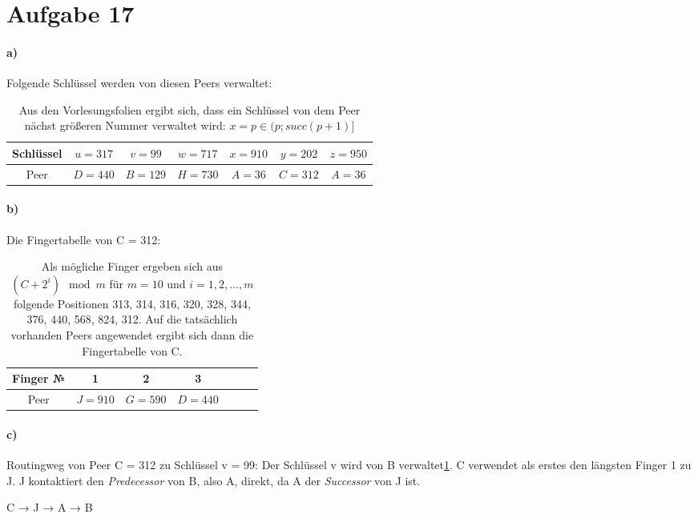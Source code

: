\documentclass[10pt,a4paper]{article}
\begin{document}
\newpage

\section*{Aufgabe 17}
\paragraph*{a)} Folgende Schlüssel werden von diesen Peers verwaltet:

\begin{table}[h]
\centering
\begin{tabular}{c|c|c|c|c|c|c}
Schlüssel & $u=317$ & $v=99$ & $w=717$ & $x=910$ & $y=202$ & $z=950$ \\ 
\hline 
Peer & $D=440$ & $B=129$ & $H=730$ & $A=36$ & $C=312$ & $A=36$ \\ 
\end{tabular} 
\caption{Aus den Vorlesungsfolien ergibt sich, dass ein Schlüssel von dem Peer nächst größeren Nummer verwaltet wird: $x=p \in (p;succ(p+1)]$}
\label{Schlüsseltabelle}
\end{table}

\paragraph*{b)} Die Fingertabelle von C = 312:
\begin{table}[h]
\centering
\begin{tabular}{c|c|c|c|c|c|c}
Finger № & 1 & 2 & 3   \\ 
\hline 
Peer & $J=910$ & $G=590$ & $D=440$   \\ 
\end{tabular} 
\caption{Als mögliche Finger ergeben sich aus $(C+2^{i})\mod m$ für $m=10$ und $i = 1,2,…,m$ folgende Positionen 313, 314, 316, 320, 328, 344, 376, 440, 568, 824, 312. Auf die tatsächlich vorhanden Peers angewendet ergibt sich dann die Fingertabelle von C.}
\end{table}

\paragraph*{c)} Routingweg von Peer C = 312 zu Schlüssel v = 99: Der Schlüssel v wird von B verwaltet\ref{Schlüsseltabelle}. C verwendet als erstes den längsten Finger 1 zu J. J kontaktiert den \textit{Predecessor} von B, also A, direkt, da A der \textit{Successor} von J ist.
\begin{center}
C → J → A → B
\end{center}
\end{document}
